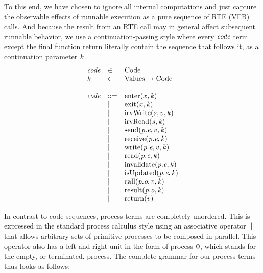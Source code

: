 \documentclass[twocolumn]{article}
\begin{document}
To this end, we have chosen to ignore all internal computations and just capture the observable effects of runnable execution as a pure sequence of RTE (VFB) calls. And because the result from an RTE call may in general affect subsequent runnable behavior, we use a continuation-passing style where every $\Code$ term except the final function return literally contain the sequence that follows it, as a continuation parameter $\Cont$.
%
\[
\begin{array}{lll}
  \Code & \in & \text{Code}								\\
  \Cont & \in & \text{Values} \rightarrow \text{Code}   \\ \\
  \Code & ::= & \Enter x \Cont               \\
        & |   & \Exit x \Cont                \\
        & |   & \IrvWrite s v \Cont          \\
        & |   & \IrvRead s \Cont             \\
        & |   & \Send {\Te e p} v \Cont      \\
        & |   & \Receive {\Te e p} \Cont     \\
        & |   & \Write {\Te e p} v \Cont     \\
        & |   & \Read {\Te e p} \Cont        \\
        & |   & \Invalidate {\Te e p} \Cont  \\
        & |   & \IsUpdated {\Te e p} \Cont   \\
        & |   & \Call {\To o p} v \Cont      \\
        & |   & \Result {\To o p} \Cont      \\
        & |   & \Return v                    \\
\end{array}
\]

In contrast to code sequences, process terms are completely unordered. This is expressed in the standard process calculus style using an associative operator $\Tpar{}{}$ that allows arbitrary sets of primitive processes to be composed in parallel. This operator also has a left and right unit in the form of process $\textbf{0}$, which stands for the empty, or terminated, process. The complete grammar for our process terms thus looks as follows:
\end{document}
